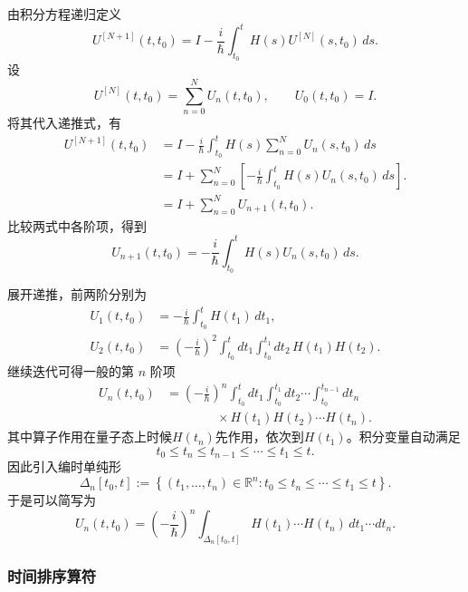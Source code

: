 \documentclass[UTF8,a4paper,11pt,openany]{ctexbook}
\begin{document}
由积分方程递归定义
\[
U^{[N+1]}(t,t_0)
=
I-\frac{i}{\hbar}
\int_{t_0}^{t}
H(s)U^{[N]}(s,t_0)\,ds.
\]
设
\[
U^{[N]}(t,t_0)
=
\sum_{n=0}^{N}U_n(t,t_0),
\qquad
U_0(t,t_0)=I.
\]
将其代入递推式，有
\begin{align}
    U^{[N+1]}(t,t_0)
    &=
    I-\frac{i}{\hbar}
    \int_{t_0}^{t}
    H(s)
    \sum_{n=0}^{N}U_n(s,t_0)\,ds
    \nonumber\\
    &=
    I+
    \sum_{n=0}^{N}
    \left[
    -\frac{i}{\hbar}
    \int_{t_0}^{t}
    H(s)U_n(s,t_0)\,ds
    \right]. \nonumber\\
    &= I+\sum_{n=0}^{N}U_{n+1}(t,t_0).
\end{align}
比较两式中各阶项，得到
\begin{equation}
    U_{n+1}(t,t_0)
    =
    -\frac{i}{\hbar}
    \int_{t_0}^{t}
    H(s)U_n(s,t_0)\,ds.
\end{equation}

展开递推，前两阶分别为
\begin{align}
    U_1(t,t_0)
    &=
    -\frac{i}{\hbar}
    \int_{t_0}^{t}H(t_1)\,dt_1,
    \nonumber\\
    U_2(t,t_0)
    &=
    \left(-\frac{i}{\hbar}\right)^2
    \int_{t_0}^{t}dt_1
    \int_{t_0}^{t_1}dt_2\,
    H(t_1)H(t_2).
\end{align}
继续迭代可得一般的第 $n$ 阶项
\begin{align}
    U_n(t,t_0)
    &=
    \left(-\frac{i}{\hbar}\right)^n
    \int_{t_0}^{t}dt_1
    \int_{t_0}^{t_1}dt_2
    \cdots
    \int_{t_0}^{t_{n-1}}dt_n
    \nonumber\\
    &\qquad\qquad\times
    H(t_1)H(t_2)\cdots H(t_n).
\end{align}
其中算子作用在量子态上时候$H(t_n)$先作用，依次到$H(t_1)$。积分变量自动满足
\[
t_0\leq t_n\leq t_{n-1}\leq\cdots\leq t_1\leq t.
\]
因此引入编时单纯形
\begin{equation}
    \Delta_n[t_0,t]
    :=
    \left\{
    (t_1,\ldots,t_n)\in\mathbb R^n:
    t_0\leq t_n\leq\cdots\leq t_1\leq t
    \right\}.
\end{equation}
于是可以简写为
\begin{equation}
    U_n(t,t_0)
    =
    \left(-\frac{i}{\hbar}\right)^n
    \int_{\Delta_n[t_0,t]}
    H(t_1)\cdots H(t_n)\,
    dt_1\cdots dt_n.
\end{equation}

\subsubsection*{时间排序算符}
\end{document}
